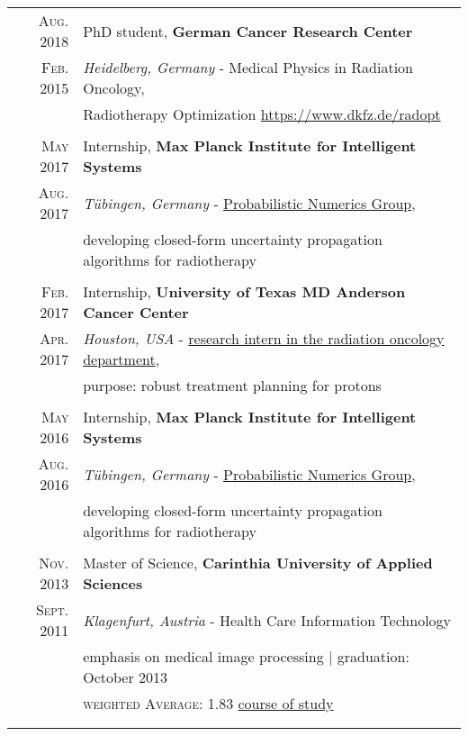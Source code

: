 \documentclass[a4paper,10pt]{article}
\begin{document}
\begin{tabular}{rl}	
\textsc{Aug.} 2018 & PhD student, \textbf{German Cancer Research Center}\\
\textsc{Feb.} 2015 &\emph{Heidelberg, Germany} - Medical Physics in Radiation Oncology,\\
& Radiotherapy Optimization \url{https://www.dkfz.de/radopt}\\
&\\

\textsc{May} 2017 & Internship, \textbf{Max Planck Institute for Intelligent Systems}\\
\textsc{Aug.} 2017 &\emph{T{\"u}bingen, Germany} - \href{https://pn.is.tuebingen.mpg.de/person/phennig}{Probabilistic Numerics Group},\\
&developing closed-form uncertainty propagation algorithms for radiotherapy\\
&\\

\textsc{Feb.} 2017 & Internship, \textbf{University of Texas MD Anderson Cancer Center}\\
\textsc{Apr.} 2017 &\emph{Houston, USA} - \href{https://faculty.mdanderson.org/profiles/radhe_mohan.html}{research intern in the radiation oncology department},\\
& purpose: robust treatment planning for protons\\
&\\

\textsc{May} 2016 & Internship, \textbf{Max Planck Institute for Intelligent Systems}\\
\textsc{Aug.} 2016 &\emph{T{\"u}bingen, Germany} - \href{https://pn.is.tuebingen.mpg.de/person/phennig}{Probabilistic Numerics Group},\\
&developing closed-form uncertainty propagation algorithms for radiotherapy\\
&\\

\textsc{Nov.} 2013 & Master of Science, \textbf{Carinthia University of Applied Sciences}\\
\textsc{Sept.} 2011 &\emph{Klagenfurt, Austria} - Health Care Information Technology\\
& emphasis on medical image processing | graduation: October 2013 \\
&\normalsize \textsc{weighted Average}: 1.83 \hspace{10mm} \href{https://www.fh-kaernten.at/en/degree-programs/engineering-it/overview/engineering-it/master/health-care-it/degree-program-health-care-it/}{course of study}\\\\
&\\


\end{tabular}
\end{document}
